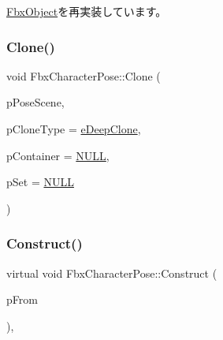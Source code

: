 \hyperlink{class_fbx_object_ad553a4262b09cb57c3171a93edadbab8}{Fbx\+Object}を再実装しています。

\mbox{\label{class_fbx_character_pose_ac7f229efcac9268afb0e37540a29a08d}} 
\subsubsection{\texorpdfstring{Clone()}{Clone()}\hspace{0.1cm}{\footnotesize\ttfamily [2/2]}}
{\footnotesize\ttfamily void Fbx\+Character\+Pose\+::\+Clone (\begin{DoxyParamCaption}\item[{\hyperlink{class_fbx_scene}{Fbx\+Scene} $\ast$}]{p\+Pose\+Scene,  }\item[{\hyperlink{class_fbx_object_a9f5626b2d2135684d6ea1e6e4ad2acbb}{Fbx\+Object\+::\+E\+Clone\+Type}}]{p\+Clone\+Type = {\ttfamily \hyperlink{class_fbx_object_a9f5626b2d2135684d6ea1e6e4ad2acbbaacdf137ca059c572798287e98c4236d0}{e\+Deep\+Clone}},  }\item[{\hyperlink{class_fbx_object}{Fbx\+Object} $\ast$}]{p\+Container = {\ttfamily \hyperlink{fbxarch_8h_a070d2ce7b6bb7e5c05602aa8c308d0c4}{N\+U\+LL}},  }\item[{void $\ast$}]{p\+Set = {\ttfamily \hyperlink{fbxarch_8h_a070d2ce7b6bb7e5c05602aa8c308d0c4}{N\+U\+LL}} }\end{DoxyParamCaption})}

\mbox{\label{class_fbx_character_pose_a9da449d510900348679190d90deb5a8a}} 
\subsubsection{\texorpdfstring{Construct()}{Construct()}}
{\footnotesize\ttfamily virtual void Fbx\+Character\+Pose\+::\+Construct (\begin{DoxyParamCaption}\item[{const \hyperlink{class_fbx_object}{Fbx\+Object} $\ast$}]{p\+From }\end{DoxyParamCaption})\hspace{0.3cm}{\ttfamily [protected]}, {\ttfamily [virtual]}}

